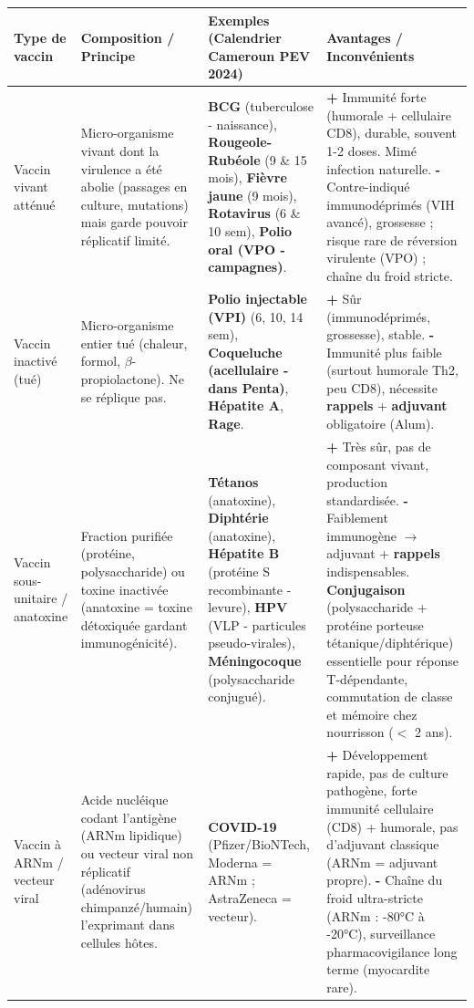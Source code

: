 \documentclass[11pt]{article}
\newcommand{\cle}[1]{{\popxbold\color{popdark}#1}}
\begin{document}
\begin{center}
\begin{tabularx}{\linewidth}{|l|X|X|X|}
\hline
\rowcolor{popblueL}
\textbf{Type de vaccin} & \textbf{Composition / Principe} & \textbf{Exemples (Calendrier Cameroun PEV 2024)} & \textbf{Avantages / Inconvénients} \\
\hline
\cle{Vaccin vivant atténué} & Micro-organisme vivant dont la virulence a été abolie (passages en culture, mutations) mais garde pouvoir réplicatif limité. & \textbf{BCG} (tuberculose - naissance), \textbf{Rougeole-Rubéole} (9 \& 15 mois), \textbf{Fièvre jaune} (9 mois), \textbf{Rotavirus} (6 \& 10 sem), \textbf{Polio oral (VPO - campagnes)}. & \textbf{+} Immunité forte (humorale + cellulaire CD8), durable, souvent 1-2 doses. Mimé infection naturelle. \textbf{-} Contre-indiqué immunodéprimés (VIH avancé), grossesse ; risque rare de réversion virulente (VPO) ; chaîne du froid stricte. \\
\hline
\cle{Vaccin inactivé (tué)} & Micro-organisme entier tué (chaleur, formol, $\beta$-propiolactone). Ne se réplique pas. & \textbf{Polio injectable (VPI)} (6, 10, 14 sem), \textbf{Coqueluche (acellulaire - dans Penta)}, \textbf{Hépatite A}, \textbf{Rage}. & \textbf{+} Sûr (immunodéprimés, grossesse), stable. \textbf{-} Immunité plus faible (surtout humorale Th2, peu CD8), nécessite \textbf{rappels} + \textbf{adjuvant} obligatoire (Alum). \\
\hline
\cle{Vaccin sous-unitaire / anatoxine} & Fraction purifiée (protéine, polysaccharide) ou toxine inactivée (anatoxine = toxine détoxiquée gardant immunogénicité). & \textbf{Tétanos} (anatoxine), \textbf{Diphtérie} (anatoxine), \textbf{Hépatite B} (protéine S recombinante - levure), \textbf{HPV} (VLP - particules pseudo-virales), \textbf{Méningocoque} (polysaccharide conjugué). & \textbf{+} Très sûr, pas de composant vivant, production standardisée. \textbf{-} Faiblement immunogène $\rightarrow$ adjuvant + \textbf{rappels} indispensables. \textbf{Conjugaison} (polysaccharide + protéine porteuse tétanique/diphtérique) essentielle pour réponse T-dépendante, commutation de classe et mémoire chez nourrisson ($<$ 2 ans). \\
\hline
\cle{Vaccin à ARNm / vecteur viral} & Acide nucléique codant l'antigène (ARNm lipidique) ou vecteur viral non réplicatif (adénovirus chimpanzé/humain) l'exprimant dans cellules hôtes. & \textbf{COVID-19} (Pfizer/BioNTech, Moderna = ARNm ; AstraZeneca = vecteur). & \textbf{+} Développement rapide, pas de culture pathogène, forte immunité cellulaire (CD8) + humorale, pas d'adjuvant classique (ARNm = adjuvant propre). \textbf{-} Chaîne du froid ultra-stricte (ARNm : -80°C à -20°C), surveillance pharmacovigilance long terme (myocardite rare). \\
\hline
\end{tabularx}
\end{center}
\end{document}
